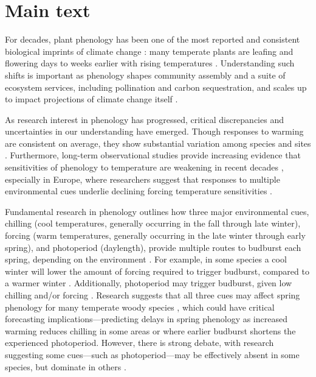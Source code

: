 \documentclass{article}
\begin{document}
\section* {Main text}
\par For decades, plant phenology has been one of the most reported and consistent biological imprints of climate change \emph{\citep{IPCC:2014sm}}: many temperate plants are leafing and flowering days to weeks earlier with rising temperatures \emph{\citep{millerrushing2008,menzel2006}}. Understanding such shifts is important as phenology shapes community assembly and a suite of ecosystem services, including pollination and carbon sequestration, and scales up to impact projections of climate change itself \emph{\citep{Cleland:2007or}}.
\par As research interest in phenology has progressed, critical discrepancies and uncertainties in our understanding have emerged. Though responses to warming are consistent on average, they show substantial variation among species and sites \emph{\citep{Wolkovich:2012n}}. Furthermore, long-term observational studies provide increasing evidence that sensitivities of phenology to temperature are weakening in recent decades \emph{\citep{Rutishauser:2008,yu2010,wang2019}}, especially in Europe, where researchers suggest that responses to multiple environmental cues underlie declining forcing temperature sensitivities \emph{\citep{fu2015}}. %

\par Fundamental research in phenology outlines how three major environmental cues, chilling (cool temperatures, generally occurring in the fall through late winter), forcing (warm temperatures, generally occurring in the late winter through early spring), and photoperiod (daylength), provide multiple routes to budburst each spring, depending on the environment \emph{\citep{chuine2016}}. For example, in some species a cool winter will lower the amount of forcing required to trigger budburst, compared to a warmer winter \emph{\citep{harrington2015}}. Additionally, photoperiod may trigger budburst, given low chilling and/or forcing \emph{\citep{zohner2016,Basler:2014aa, Caffarra:2011b}}. Research suggests that all three cues may affect spring phenology for many temperate woody species \emph{\citep{flynn2018,Basler:2014aa,Caffarra:2011qf}}, which could have critical forecasting implications---predicting delays in spring phenology as increased warming reduces chilling in some areas \emph{\citep{fraga2019}} or where earlier budburst shortens the experienced photoperiod. However, there is strong debate, with research suggesting some cues---such as photoperiod---may be effectively absent in some species, but dominate in others \emph{\citep{zohner2016,Heide:1993,Basler:2014aa,Singh:2017}}. 
\end{document}

